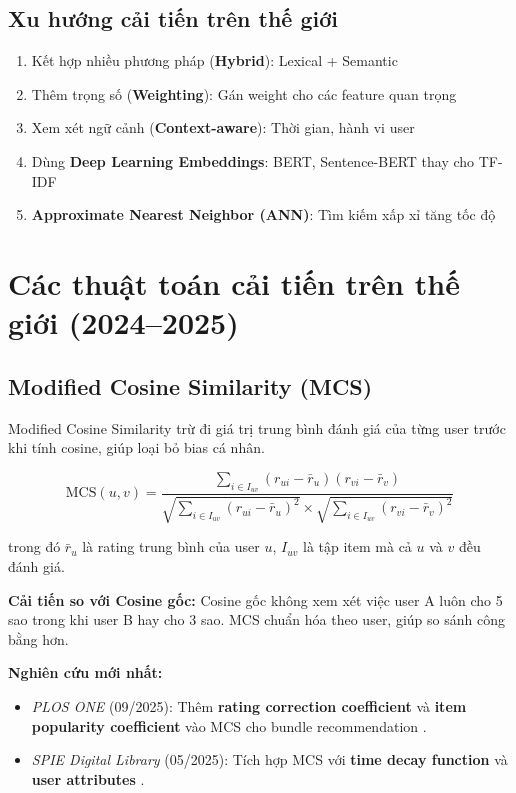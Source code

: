 \documentclass[12pt,a4paper]{article}
\begin{document}
\subsection{Xu hướng cải tiến trên thế giới}
\begin{enumerate}[noitemsep]
    \item Kết hợp nhiều phương pháp (\textbf{Hybrid}): Lexical + Semantic
    \item Thêm trọng số (\textbf{Weighting}): Gán weight cho các feature quan trọng
    \item Xem xét ngữ cảnh (\textbf{Context-aware}): Thời gian, hành vi user
    \item Dùng \textbf{Deep Learning Embeddings}: BERT, Sentence-BERT thay cho TF-IDF
    \item \textbf{Approximate Nearest Neighbor (ANN)}: Tìm kiếm xấp xỉ tăng tốc độ
\end{enumerate}

\section{Các thuật toán cải tiến trên thế giới (2024--2025)}

\subsection{Modified Cosine Similarity (MCS)}

Modified Cosine Similarity trừ đi giá trị trung bình đánh giá của từng user trước khi tính cosine, giúp loại bỏ bias cá nhân.

\begin{equation}
\text{MCS}(u, v) = \frac{\sum_{i \in I_{uv}}(r_{ui} - \bar{r}_u)(r_{vi} - \bar{r}_v)}{\sqrt{\sum_{i \in I_{uv}}(r_{ui} - \bar{r}_u)^2} \times \sqrt{\sum_{i \in I_{uv}}(r_{vi} - \bar{r}_v)^2}}
\label{eq:mcs}
\end{equation}

trong đó $\bar{r}_u$ là rating trung bình của user $u$, $I_{uv}$ là tập item mà cả $u$ và $v$ đều đánh giá.

\noindent\textbf{Cải tiến so với Cosine gốc:} Cosine gốc không xem xét việc user A luôn cho 5 sao trong khi user B hay cho 3 sao. MCS chuẩn hóa theo user, giúp so sánh công bằng hơn.

\noindent\textbf{Nghiên cứu mới nhất:}
\begin{itemize}[noitemsep]
    \item \textit{PLOS ONE} (09/2025): Thêm \textbf{rating correction coefficient} và \textbf{item popularity coefficient} vào MCS cho bundle recommendation \cite{plosone2025}.
    \item \textit{SPIE Digital Library} (05/2025): Tích hợp MCS với \textbf{time decay function} và \textbf{user attributes} \cite{spie2025}.
\end{itemize}
\end{document}
